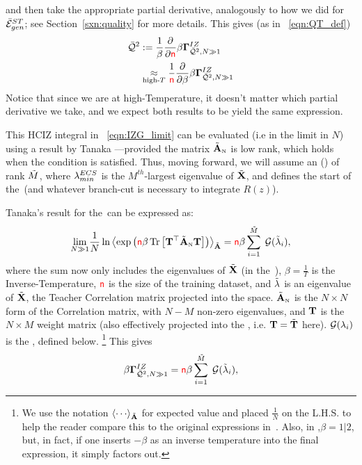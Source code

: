 and then take the appropriate partial derivative,
analogously to how we did for $\bar{\mathcal{E}}^{ST}_{gen}$; see Section~\ref{sxn:quality} for more details.
This gives (as in \EQN~\ref{eqn:QT_def})
\begin{align}
\label{eqn:IZG_generate_Q2}
\QT &:= \frac{1}{\beta}\frac{\partial }{\partial \ND}\IZGINF  \\ 
&\underset{\text{high-}T}{\approx}
\frac{1}{\ND}\frac{\partial }{\partial \beta}\IZGINF 
\end{align}
Notice that since we are at high-Temperature, it doesn't matter which partial derivative we take,
and we expect both results to be yield the same expression.

This HCIZ integral in \EQN~\ref{eqn:IZG_limit} can be evaluated
(i.e in the \LargeN limit in $N$) using a result by Tanaka ---provided
the matrix $\tilde{\mathbf{A}}_{\text{\tiny N}}$ is low rank, which holds when the \TRACELOG condition is satisfied.
Thus, moving forward, we will assume an
\EffectiveCorrelationSpace (\ECS) of rank $\tilde{M}$, where $\lambda^{ECS}_{min}$ is the $M^{th}$-largest eigenvalue of $\tilde{\mathbf{X}}$,
and defines the start of the~\ECS (and whatever branch-cut is necessary to integrate $R(z)$).

Tanaka's result for the~\ECS can be expressed as:
\begin{equation}
  \label{eqn:tanaka_result}
  \underset{N\gg 1}{\lim}\frac{1}{N}\ln
\Expected[\AECS]{\exp\left(\ND\beta \Trace{\TMAT^{\top}\AECSN\TMAT}\right)}
  =\ND\beta\sum\limits_{i=1}^{\MECS}\;\GNECSI,
\end{equation}
where the sum now only includes the eigenvalues of $\tilde{\mathbf{X}}$ (in the~\ECS), $\beta=\tfrac{1}{T}$
is the Inverse-Temperature, ${\color{red}\sf{n}}$ is the size of the training dataset, and $\tilde{\lambda}$ is an eigenvalue of $\tilde{\mathbf{X}}$, the Teacher
Correlation matrix projected into the \ECS space.
$\tilde{\mathbf{A}}_{\text{\tiny N}}$ is the $N \times N$ form of the \Student Correlation matrix,
with $N-M$ non-zero eigenvalues, and ${\mathbf{T}}$ is the $N\times M$ \Teacher  weight matrix
(also effectively projected into the \ECS, i.e. ${\mathbf{T}}=\tilde{\mathbf{T}}$ here).
$\mathcal{G}(\lambda_{i})$ is the \GEN, defined below.
\footnote{We use the notation $\Expected[\AECS]{\cdots}$ for expected value and placed $\tfrac{1}{N}$ on the L.H.S.
to help the reader compare this to the original expressions in~\cite{Tanaka2007, Tanaka2008}.
Also,  in \cite{Tanaka2007, Tanaka2008},$\beta=1|2$, but, in fact, if one inserts $-\beta$ as an inverse temperature into the final expression, it simply factors out.}
This gives
\begin{equation}
\label{eqn:tanaka_result2}
\IZGINF = \ND\beta\sum\limits_{i=1}^{\MECS}\;\GNECSI,
\end{equation}


